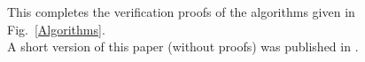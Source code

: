 \documentclass{elsartNoFoot}
\newcommand{\1}{\color{red}}
\newcommand{\2}{\color{green}}
\newcommand{\+}[3]{{\renewcommand{\i}{{#1}}{#3},\ldots,\renewcommand{\i}{{#2}}{#3}}}
\begin{document}
This completes the verification proofs of the algorithms given in
Fig.~\ref{Algorithms}.
\\
A short version of this paper (without proofs) was published in
\cite{Burghardt.2001}.



\end{document}
